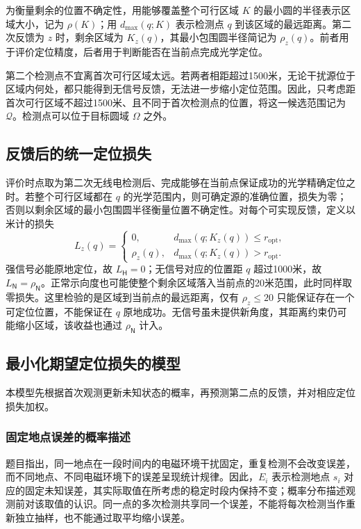 \documentclass[UTF8,a4paper,zihao=-4,fontset=none]{ctexart}
\begin{document}
为衡量剩余的位置不确定性，用能够覆盖整个可行区域 \(K\) 的最小圆的半径表示区域大小，记为 \(\rho(K)\)；用 \(d_{\max}(q;K)\) 表示检测点 \(q\) 到该区域的最远距离。第二次反馈为 \(z\) 时，剩余区域为 \(K_z(q)\)，其最小包围圆半径简记为 \(\rho_z(q)\)。前者用于评价定位精度，后者用于判断能否在当前点完成光学定位。

第二个检测点不宜离首次可行区域太远。若两者相距超过1500米，无论干扰源位于区域内何处，都只能得到无信号反馈，无法进一步缩小定位范围。因此，只考虑距首次可行区域不超过1500米、且不同于首次检测点的位置，将这一候选范围记为 \(\mathcal Q\)。检测点可以位于目标圆域 \(\Omega\) 之外。

\subsection{反馈后的统一定位损失}

评价时点取为第二次无线电检测后、完成能够在当前点保证成功的光学精确定位之时。若整个可行区域都在 \(q\) 的光学范围内，则可确定源的准确位置，损失为零；否则以剩余区域的最小包围圆半径衡量位置不确定性。对每个可实现反馈，定义以米计的损失
\begin{equation}
 L_z(q)=
 \begin{cases}
 0,&d_{\max}(q;K_z(q))\le r_{\mathrm{opt}},\\
 \rho_z(q),&d_{\max}(q;K_z(q))>r_{\mathrm{opt}}.
 \end{cases}
\label{eq:q2-pair-loss}
\end{equation}
强信号必能原地定位，故 \(L_{\mathsf H}=0\)；无信号对应的位置距 \(q\) 超过1000米，故 \(L_{\mathsf N}=\rho_{\mathsf N}\)。正常示向度也可能使整个剩余区域落入当前点的20米范围，此时同样取零损失。这里检验的是区域到当前点的最远距离，仅有 \(\rho_z\le20\) 只能保证存在一个可定位位置，不能保证在 \(q\) 原地成功。无信号虽未提供新角度，其距离约束仍可能缩小区域，该收益也通过 \(\rho_{\mathsf N}\) 计入。

\subsection{最小化期望定位损失的模型}

本模型先根据首次观测更新未知状态的概率，再预测第二点的反馈，并对相应定位损失加权。

\subsubsection{固定地点误差的概率描述}

题目指出，同一地点在一段时间内的电磁环境干扰固定，重复检测不会改变误差，而不同地点、不同电磁环境下的误差呈现统计规律。因此，\(E_i\) 表示检测地点 \(s_i\) 对应的固定未知误差，其实际取值在所考虑的稳定时段内保持不变；概率分布描述观测前对该取值的认识。同一点的多次检测共享同一个误差，不能将每次检测当作重新独立抽样，也不能通过取平均缩小误差。
\end{document}
